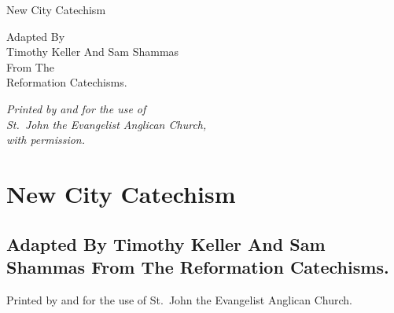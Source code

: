 \documentclass[]{memoir}
\begin{document}





\pagestyle{empty}

\vfill

\begin{center}
	\begin{minipage}{3in}
	{\centering
	\Huge{New City Catechism}
	\par}
	\end{minipage}
\end{center}

\vfill

\begin{center}
	\begin{minipage}{3in}
	{\centering
	Adapted By\\
	Timothy Keller And Sam Shammas\\
	From The\\
	Reformation Catechisms.\par}
	\end{minipage}
\end{center}

\vfill

\begin{center}
	\begin{minipage}{3in}
	\begin{center}
	{\em Printed by and for the use of\\ St.\ John the Evangelist Anglican Church,\\ with permission.}
	\end{center}
	\end{minipage}
\end{center}

\vfill

\cleardoublepage
{}

\chapter*{New City Catechism}

\section*{Adapted By Timothy Keller And Sam Shammas From The Reformation Catechisms.}

Printed by and for the use of St.\ John the Evangelist Anglican Church.
\end{document}
